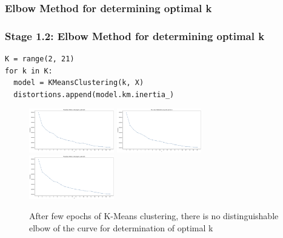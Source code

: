 \documentclass{tum-presentation}
\begin{document}
\subsubsection{Elbow Method for determining optimal k}
\begin{frame}[fragile]
  \frametitle{Stage 1.2: Elbow Method for determining optimal k}
  \begin{lstlisting}
K = range(2, 21)
for k in K:
  model = KMeansClustering(k, X)
  distortions.append(model.km.inertia_)
  \end{lstlisting}
  \begin{center}
    \begin{figure}[t]
      \includegraphics[width=0.33\textwidth]{images/elbow-1.png}
      \includegraphics[width=0.33\textwidth]{images/elbow-2.png}
      \includegraphics[width=0.33\textwidth]{images/elbow-3.png}
      \caption{After few epochs of K-Means clustering, there is no distinguishable elbow of the curve for determination of optimal k}
    \end{figure}
  \end{center}
\end{frame}
\end{document}
